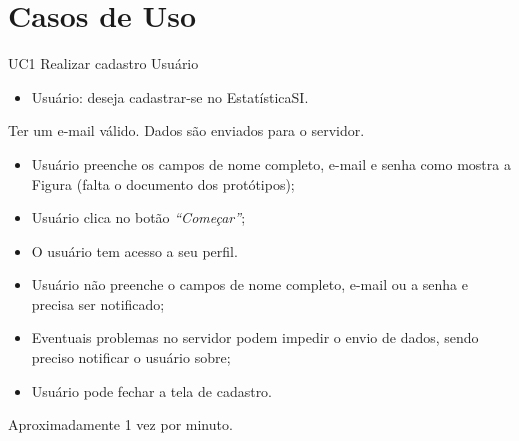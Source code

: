 \chapter{Casos de Uso}

\casoDeUso
{UC1}
{Realizar cadastro}
{Usuário}
{
\begin{itemize}
	\item Usuário: deseja cadastrar-se no EstatísticaSI.	
\end{itemize}

}
{Ter um e-mail válido.}
{Dados são enviados para o servidor.}
{
\begin{itemize}
	\item Usuário preenche os campos de nome completo, e-mail e senha como mostra a Figura (falta o documento dos protótipos); 
	\item Usuário clica no botão \textit{“Começar”};	
	\item O usuário tem acesso a seu perfil.	
			
\end{itemize}
}
{
\begin{itemize}
	\item Usuário não preenche o campos de nome completo, e-mail ou a senha e precisa ser notificado;
	\item Eventuais problemas no servidor podem impedir o envio de dados, sendo preciso notificar o usuário sobre;
	\item Usuário pode fechar a tela de cadastro.
	
\end{itemize}
}
{Aproximadamente 1 vez por minuto.}
{

}


